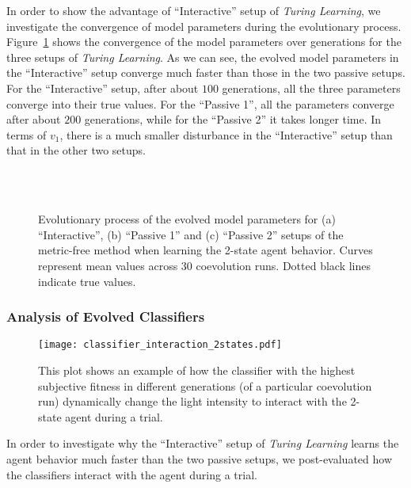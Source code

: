 In order to show the advantage of ``Interactive'' setup of \textit{Turing Learning}, we investigate the convergence of model parameters during the evolutionary process. Figure~\ref{fig:model_parameters_convergence_stochastic_2states} shows the convergence of the model parameters over generations for the three setups of \textit{Turing Learning}. As we can see, the evolved model parameters in the ``Interactive'' setup converge much faster than those in the two passive setups. For the ``Interactive'' setup, after about $100$ generations, all the three parameters converge into their true values. For the ``Passive 1'', all the parameters converge after about $200$ generations, while for the ``Passive 2'' it takes longer time. In terms of $v_1$, there is a much smaller disturbance in the ``Interactive'' setup than that in the other two setups. 

\begin{figure}[!t]%
	\centering
		\\
		\\
		\caption{Evolutionary process of the evolved model parameters for (a) ``Interactive'', (b) ``Passive 1'' and (c) ``Passive 2'' setups of the metric-free method when learning the 2-state agent behavior. Curves represent mean values across 30 coevolution runs. Dotted black lines indicate true values.\label{fig:model_parameters_convergence_stochastic_2states}}
\end{figure}

\subsubsection{Analysis of Evolved Classifiers}
%
\begin{figure}[!t]
\centering
\texttt{[image: classifier\_interaction\_2states.pdf]}
\caption{This plot shows an example of how the classifier with the highest subjective fitness in different generations (of a particular coevolution run) dynamically change the light intensity to interact with the 2-state agent during a trial.}
\label{fig:classifier_interaction_2states}
\end{figure}
%
In order to investigate why the ``Interactive'' setup of \textit{Turing Learning} learns the agent behavior much faster than the two passive setups, we post-evaluated how the classifiers interact with the agent during a trial. 

